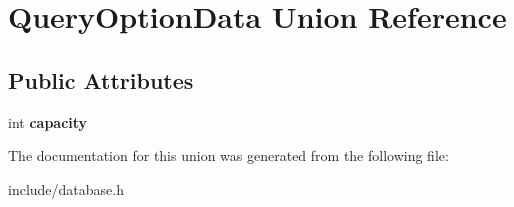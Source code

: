 \hypertarget{union_query_option_data}{}\section{Query\+Option\+Data Union Reference}
\label{union_query_option_data}
\subsection*{Public Attributes}
\begin{DoxyCompactItemize}
\item 
\mbox{\label{union_query_option_data_aff4c9bdf206c01994c797a119c922fa9}} 
int {\bfseries capacity}
\end{DoxyCompactItemize}


The documentation for this union was generated from the following file\+:\begin{DoxyCompactItemize}
\item 
include/database.\+h\end{DoxyCompactItemize}
